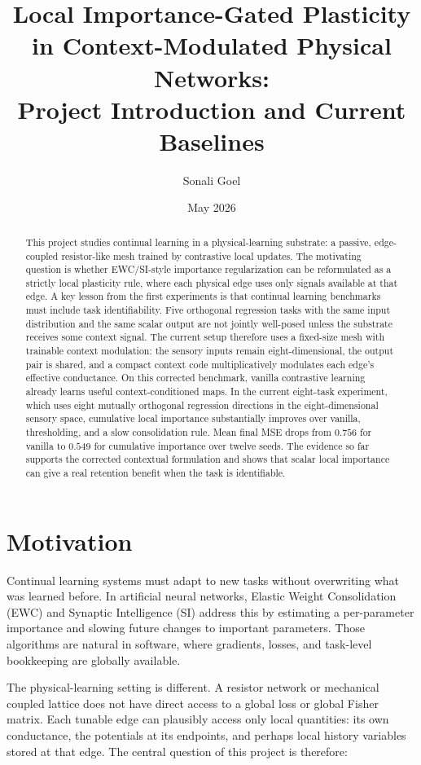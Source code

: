\documentclass[11pt]{article}
\title{Local Importance-Gated Plasticity in Context-Modulated Physical Networks:\\
       \large Project Introduction and Current Baselines}
\author{Sonali Goel}
\date{May 2026}
\begin{document}
\maketitle

\begin{abstract}
This project studies continual learning in a physical-learning substrate:
a passive, edge-coupled resistor-like mesh trained by contrastive local
updates. The motivating question is whether EWC/SI-style importance
regularization can be reformulated as a strictly local plasticity rule,
where each physical edge uses only signals available at that edge. A key
lesson from the first experiments is that continual learning benchmarks
must include task identifiability. Five orthogonal regression tasks with
the same input distribution and the same scalar output are not jointly
well-posed unless the substrate receives some context signal. The current
setup therefore uses a fixed-size mesh with trainable context modulation:
the sensory inputs remain eight-dimensional, the output pair is shared,
and a compact context code multiplicatively modulates each edge's
effective conductance. On this corrected benchmark, vanilla contrastive
learning already learns useful context-conditioned maps. In the current
eight-task experiment, which uses eight mutually orthogonal regression
directions in the eight-dimensional sensory space, cumulative local
importance substantially improves over vanilla, thresholding, and a slow
consolidation rule. Mean final MSE drops from $0.756$ for vanilla to
$0.549$ for cumulative importance over twelve seeds. The evidence so far
supports the corrected contextual formulation and shows that scalar local
importance can give a real retention benefit when the task is
identifiable.
\end{abstract}

\section{Motivation}

Continual learning systems must adapt to new tasks without overwriting
what was learned before. In artificial neural networks, Elastic Weight
Consolidation (EWC) \cite{kirkpatrick2017} and Synaptic Intelligence (SI)
\cite{zenke2017} address this by estimating a per-parameter importance
and slowing future changes to important parameters. Those algorithms are
natural in software, where gradients, losses, and task-level bookkeeping
are globally available.

The physical-learning setting is different. A resistor network or
mechanical coupled lattice does not have direct access to a global loss
or global Fisher matrix. Each tunable edge can plausibly access only
local quantities: its own conductance, the potentials at its endpoints,
and perhaps local history variables stored at that edge. The central
question of this project is therefore:
\end{document}
